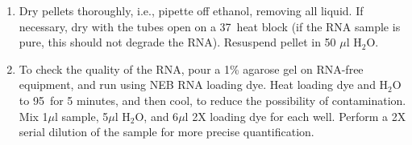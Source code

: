 \documentclass{article}
\newcommand{\mul}{\ensuremath{\mu}l }
\begin{document}
\begin{enumerate}
\item Dry pellets thoroughly, i.e., pipette off ethanol, removing all liquid. If necessary, dry with the tubes open on a 37\celsius\ heat block (if the RNA sample is pure, this should not degrade the RNA). Resuspend pellet in 50 \mul H$_2$O.

\item To check the quality of the RNA, pour a 1\% agarose gel on RNA-free equipment, and run using NEB RNA loading dye. Heat loading dye and H$_2$O to 95\celsius\ for 5 minutes, and then cool, to reduce the possibility of contamination. Mix 1\mul sample, 5\mul H$_2$O, and 6\mul 2X loading dye for each well. Perform a 2X serial dilution of the sample for more precise quantification.
\end{enumerate}
\end{document}

